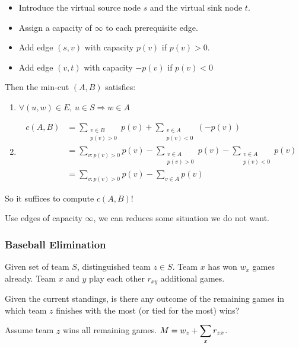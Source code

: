     \begin{itemize}
        \item Introduce the virtual source node  $ s $ and the virtual sink node  $ t $.
        \item Assign a capacity of  $ \infty $ to each prerequisite edge.
        \item Add edge  $ (s,v) $ with capacity  $ p(v) $ if  $ p(v)>0 $.
        \item Add edge  $ (v,t) $ with capacity  $ -p(v) $ if  $ p(v)<0 $ 
    \end{itemize}

    Then the min-cut $ (A,B)  $ satisfies:
    \begin{enumerate}[label=\arabic*)]
        \item  $ \forall (u,w)\in E  $,  $ u\in S\Rightarrow w\in A $ 
        \item \begin{align*}
            c(A,B)&=\sum_{\substack{v\in B\\p(v)>0}}p(v)+\sum_{\substack{v\in A\\p(v)<0}}(-p(v))\\
            &=\sum_{v:p(v)>0}p(v)-\sum_{\substack{v\in A\\p(v)>0}}p(v)-\sum_{\substack{v\in A\\p(v)<0}}p(v)\\
            &=\sum_{v:p(v)>0}p(v)-\sum_{v\in A}p(v)
        \end{align*}
    \end{enumerate}

    So it suffices to compute  $ c(A,B) $!

    \begin{remark}
        Use edges of capacity $ \infty $, we can reduces some situation we do not want.
    \end{remark}

    \subsubsection{Baseball Elimination}
    \begin{example}
        Given set of team  $ S $, distinguished team  $ z\in S $. Team  $ x  $ has won  $ w_x  $ games already. Team  $ x  $ and  $ y  $ play each other  $ r_{xy} $  additional games.

        Given the current standings, is there any outcome of the remaining games in which team  $ z $ finishes with the most (or tied for the most) wins?
    \end{example}
    Assume team  $ z  $ wins all remaining games.  $ M=w_z+\displaystyle\sum_{x}r_{zx} $.

